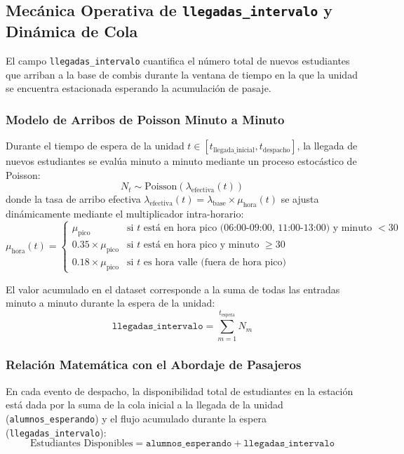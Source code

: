 \subsection{Mecánica Operativa de \texttt{llegadas\_intervalo} y Dinámica de Cola}

El campo \texttt{llegadas\_intervalo} cuantifica el número total de nuevos estudiantes que arriban a la base de combis durante la ventana de tiempo en la que la unidad se encuentra estacionada esperando la acumulación de pasaje.

\subsubsection{Modelo de Arribos de Poisson Minuto a Minuto}
Durante el tiempo de espera de la unidad $t \in [t_{\text{llegada\_inicial}}, t_{\text{despacho}}]$, la llegada de nuevos estudiantes se evalúa minuto a minuto mediante un proceso estocástico de Poisson:
\begin{equation}
    N_t \sim \text{Poisson}(\lambda_{\text{efectiva}}(t))
\end{equation}
donde la tasa de arribo efectiva $\lambda_{\text{efectiva}}(t) = \lambda_{\text{base}} \times \mu_{\text{hora}}(t)$ se ajusta dinámicamente mediante el multiplicador intra-horario:
\begin{equation}
    \mu_{\text{hora}}(t) = 
    \begin{cases}
        \mu_{\text{pico}} & \text{si } t \text{ está en hora pico (06:00-09:00, 11:00-13:00) y minuto } < 30 \\
        0.35 \times \mu_{\text{pico}} & \text{si } t \text{ está en hora pico y minuto } \ge 30 \\
        0.18 \times \mu_{\text{pico}} & \text{si } t \text{ es hora valle (fuera de hora pico)}
    \end{cases}
\end{equation}

El valor acumulado en el dataset corresponde a la suma de todas las entradas minuto a minuto durante la espera de la unidad:
\begin{equation}
    \texttt{llegadas\_intervalo} = \sum_{m=1}^{t_{\text{espera}}} N_m
\end{equation}

\subsubsection{Relación Matemática con el Abordaje de Pasajeros}
En cada evento de despacho, la disponibilidad total de estudiantes en la estación está dada por la suma de la cola inicial a la llegada de la unidad (\texttt{alumnos\_esperando}) y el flujo acumulado durante la espera (\texttt{llegadas\_intervalo}):
\begin{equation}
    \text{Estudiantes Disponibles} = \texttt{alumnos\_esperando} + \texttt{llegadas\_intervalo}
\end{equation}

